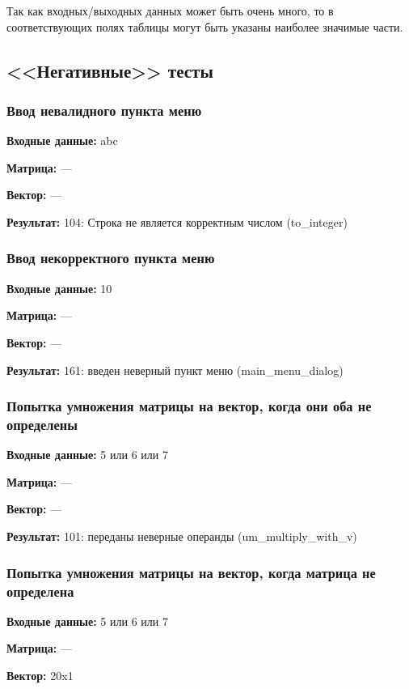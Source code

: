 \documentclass[a4paper,12pt]{extarticle}
\begin{document}
Так как входных/выходных данных может быть очень много, то в соответствующих полях таблицы могут быть указаны наиболее значимые части.

\subsection{<<Негативные>> тесты}
\subsubsection{Ввод невалидного пункта меню}

\textbf{Входные данные: }
abc

\textbf{Матрица: }
---

\textbf{Вектор: }
---

\textbf{Результат: }
104: Строка не является корректным числом (to\_integer)


\subsubsection{Ввод некорректного пункта меню}

\textbf{Входные данные: }
10

\textbf{Матрица: }
---

\textbf{Вектор: }
---

\textbf{Результат: }
161: введен неверный пункт меню (main\_menu\_dialog)

\subsubsection{Попытка умножения матрицы на вектор, когда они оба не определены}


\textbf{Входные данные: }
5 или 6 или 7

\textbf{Матрица: }
---

\textbf{Вектор: }
---

\textbf{Результат: }
101: переданы неверные операнды (um\_multiply\_with\_v)

\subsubsection{Попытка умножения матрицы на вектор, когда матрица не определена}

\textbf{Входные данные: }
5 или 6 или 7

\textbf{Матрица: }
---

\textbf{Вектор: }
20x1
\end{document}
